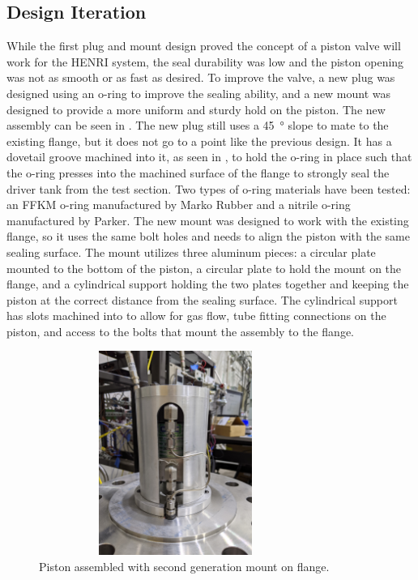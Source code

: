 \subsection{Design Iteration} \label{s:iteration}
While the first plug and mount design proved the concept of a piston valve will work for the HENRI system, the seal durability was low and the piston opening was not as smooth or as fast as desired. To improve the valve, a new plug was designed using an o-ring to improve the sealing ability, and a new mount was designed to provide a more uniform and sturdy hold on the piston. The new assembly can be seen in . The new plug still uses a \SI{45}{\degree} slope to mate to the existing flange, but it does not go to a point like the previous design. It has a dovetail groove machined into it, as seen in , to hold the o-ring in place such that the o-ring presses into the machined surface of the flange to strongly seal the driver tank from the test section. Two types of o-ring materials have been tested: an FFKM o-ring manufactured by Marko Rubber and a nitrile o-ring manufactured by Parker. The new mount was designed to work with the existing flange, so it uses the same bolt holes and needs to align the piston with the same sealing surface. The mount utilizes three aluminum pieces: a circular plate mounted to the bottom of the piston, a circular plate to hold the mount on the flange, and a cylindrical support holding the two plates together and keeping the piston at the correct distance from the sealing surface. The cylindrical support has slots machined into to allow for gas flow, tube fitting connections on the piston, and access to the bolts that mount the assembly to the flange.


%
\begin{figure}[htbp]
    \vspace{16pt}
    \centering
    \includegraphics[height=2.625in, width=3.5in,angle=270]{experiment/photos/Piston_Assembly.jpg} %
    \caption{Piston assembled with second generation mount on flange.}
    \label{fig:piston assembly}
    \vspace{16pt}
\end{figure}
%


